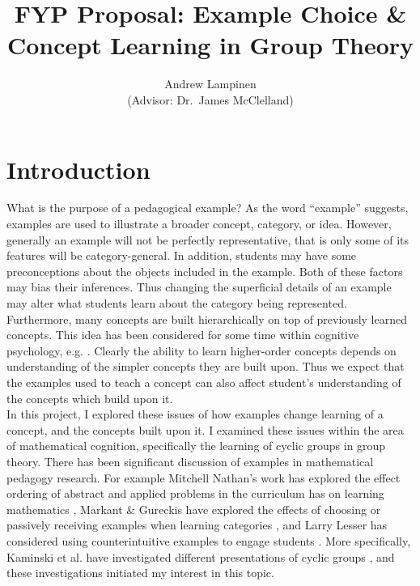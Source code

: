 \documentclass[11pt]{article}
\begin{document}
\title{FYP Proposal: Example Choice \& Concept Learning in Group Theory}
\author{Andrew Lampinen \\ (Advisor: Dr.\ James McClelland)}
\date{}
\maketitle
\section{Introduction}
What is the purpose of a pedagogical example? As the word ``example'' suggests, examples are used to illustrate a broader concept, category, or idea. However, generally an example will not be perfectly representative, that is only some of its features will be category-general. In addition, students may have some preconceptions about the objects included in the example. Both of these factors may bias their inferences. Thus changing the superficial details of an example may alter what students learn about the category being represented. \\[11pt]
Furthermore, many concepts are built hierarchically on top of previously learned concepts. This idea has been considered for some time within cognitive psychology, e.g. \cite{Fischer1980}. Clearly the ability to learn higher-order concepts depends on understanding of the simpler concepts they are built upon. Thus we expect that the examples used to teach a concept can also affect student's understanding of the concepts which build upon it.\\[11pt]
In this project, I explored these issues of how examples change learning of a concept, and the concepts built upon it. I examined these issues within the area of mathematical cognition, specifically the learning of cyclic groups in group theory. There has been significant discussion of examples in mathematical pedagogy research. For example Mitchell Nathan's work has explored the effect ordering of abstract and applied problems in the curriculum has on learning mathematics \cite{Nathan2012}, Markant \& Gureckis have explored the effects of choosing or passively receiving examples when learning categories \cite{Markant2014}, and Larry Lesser has considered using counterintuitive examples to engage students \cite{Lesser1998}. More specifically, Kaminski et al. have investigated different presentations of cyclic groups \cite{Kaminski2008}, and these investigations initiated my interest in this topic. 
\end{document}

